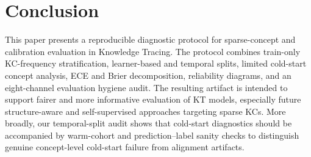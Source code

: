 \section{Conclusion}
\label{sec:conclusion}
This paper presents a reproducible diagnostic protocol for sparse-concept and calibration evaluation in Knowledge Tracing. The protocol combines train-only KC-frequency stratification, learner-based and temporal splits, limited cold-start concept analysis, ECE and Brier decomposition, reliability diagrams, and an eight-channel evaluation hygiene audit. The resulting artifact is intended to support fairer and more informative evaluation of KT models, especially future structure-aware and self-supervised approaches targeting sparse KCs. More broadly, our temporal-split audit shows that cold-start diagnostics should be accompanied by warm-cohort and prediction--label sanity checks to distinguish genuine concept-level cold-start failure from alignment artifacts.
